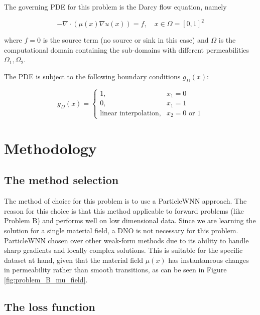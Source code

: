 The governing PDE for this problem is the Darcy flow equation, namely

\begin{equation}
	-\nabla\cdot \left( \mu(x) \nabla u(x) \right) = f, \quad x\in\Omega = [0, 1]^2
\end{equation}

\noindent
where $f=0$ is the source term (no source or sink in this case) and $\Omega$ is the computational domain containing the sub-domains with different permeabilities $\Omega_1, \Omega_2$.

The PDE is subject to the following boundary conditions $g_D(x)$:

\begin{equation}
	g_D(x) =
	\begin{cases}
		1, & x_1 = 0\\
		0, & x_1 = 1\\
		\text{linear interpolation}, & x_2 = 0 \text{ or } 1
	\end{cases}       
\end{equation}



\section{Methodology}
%
\subsection{The method selection}
%

The method of choice for this problem is to use a ParticleWNN approach. The reason for this choice is that this method applicable to forward problems (like Problem B) and performs well on low dimensional data. Since we are learning the solution for a single material field, a DNO is not necessary for this problem. ParticleWNN chosen over other weak-form methods due to its ability to handle sharp gradients and locally complex solutions. This is suitable for the specific dataset at hand, given that the material field $\mu(x)$ has instantaneous changes in permeability rather than smooth transitions, as can be seen in Figure \ref{fig:problem_B_mu_field}.

\subsection{The loss function}
%

